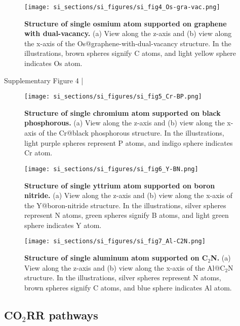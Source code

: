 \begin{figure}
  \centering
  \texttt{[image: si\_sections/si\_figures/si\_fig4\_Os-gra-vac.png]}
  \caption{\textbf{Structure of single osmium atom supported on graphene with dual-vacancy.}
  (a) View along the z-axis and (b) view along the x-axis of the Os@graphene-with-dual-vacancy structure.
  In the illustrations, brown spheres signify C atoms, and light yellow sphere indicates Os atom.}
  \label{si_fig4:Os-gra-vac}
\end{figure}
Supplementary Figure 4 |


\begin{figure}
  \centering
  \texttt{[image: si\_sections/si\_figures/si\_fig5\_Cr-BP.png]}
  \caption{\textbf{Structure of single chromium atom supported on black phosphorous.}
  (a) View along the z-axis and (b) view along the x-axis of the Cr@black phosphorous structure.
  In the illustrations, light purple spheres represent P atoms, and indigo sphere indicates Cr atom.}
  \label{si_fig5:Cr-BP}
\end{figure}


\begin{figure}
  \centering
  \texttt{[image: si\_sections/si\_figures/si\_fig6\_Y-BN.png]}
  \caption{\textbf{Structure of single yttrium atom supported on boron nitride.}
  (a) View along the z-axis and (b) view along the x-axis of the Y@boron-nitride structure.
  In the illustrations, silver spheres represent N atoms, green spheres signify B atoms,
  and light green sphere indicates Y atom.}
  \label{si_fig6:Y-BN}
\end{figure}


\begin{figure}
  \centering
  \texttt{[image: si\_sections/si\_figures/si\_fig7\_Al-C2N.png]}
  \caption{\textbf{Structure of single aluminum atom supported on C$_2$N.}
  (a) View along the z-axis and (b) view along the x-axis of the Al@C$_2$N structure.
  In the illustrations, silver spheres represent N atoms, brown spheres signify C atoms,
  and blue sphere indicates Al atom.}
  \label{si_fig7:Al-C2N}
\end{figure}


\subsection{CO$_2$RR pathways}


